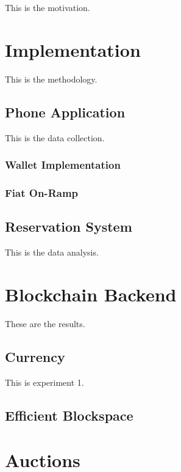 \documentclass{article}
\begin{document}
	This is the motivation.
	
	\section{Implementation}
	
	This is the methodology.
	
	\subsection{Phone Application}
	
	This is the data collection.
	
	\subsubsection{Wallet Implementation}
	
	\subsubsection{Fiat On-Ramp}
	
	\subsection{Reservation System}
	
	This is the data analysis.
	
	\section{Blockchain Backend}
	
	These are the results.
	
	\subsection{Currency}
	
	This is experiment 1.
	
	\subsection{Efficient Blockspace}
	
	\section{Auctions}
	
\end{document}
